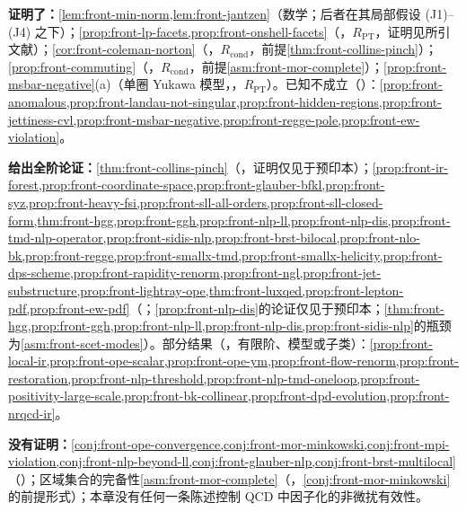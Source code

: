 \begin{tcolorbox}[enhanced,breakable,title=本章证明了什么／没有证明什么,fonttitle=\bfseries,
  colback=gray!3!white,colframe=gray!55!black,boxrule=0.6pt,arc=2pt,
  left=5pt,right=5pt,top=3pt,bottom=3pt,before skip=6pt,after skip=6pt]
\textbf{证明了：}\cref{lem:front-min-norm,lem:front-jantzen}（数学；后者在其局部假设 (J1)--(J4) 之下）；\cref{prop:front-lp-facets,prop:front-onshell-facets}（\tagR，$R_{\mathrm{PT}}$，证明见所引文献）；\cref{cor:front-coleman-norton}（\tagR，$R_{\mathrm{cond}}$，前提\cref{thm:front-collins-pinch}）；\cref{prop:front-commuting}（\tagR，$R_{\mathrm{cond}}$，前提\cref{asm:front-mor-complete}）；\cref{prop:front-msbar-negative}(a)（单圈 Yukawa 模型，\tagR，$R_{\mathrm{PT}}$）。已知不成立（\tagV）：\cref{prop:front-anomalous,prop:front-landau-not-singular,prop:front-hidden-regions,prop:front-jettiness-cvl,prop:front-msbar-negative,prop:front-regge-pole,prop:front-ew-violation}。\par
\textbf{给出全阶论证：}\cref{thm:front-collins-pinch}（\tagA，证明仅见于预印本）；\cref{prop:front-ir-forest,prop:front-coordinate-space,prop:front-glauber-bfkl,prop:front-syz,prop:front-heavy-fsi,prop:front-sll-all-orders,prop:front-sll-closed-form,thm:front-hgg,prop:front-ggh,prop:front-nlp-ll,prop:front-nlp-dis,prop:front-tmd-nlp-operator,prop:front-sidis-nlp,prop:front-brst-bilocal,prop:front-nlo-bk,prop:front-regge,prop:front-smallx-tmd,prop:front-smallx-helicity,prop:front-dps-scheme,prop:front-rapidity-renorm,prop:front-ngl,prop:front-jet-substructure,prop:front-lightray-ope,thm:front-luxqed,prop:front-lepton-pdf,prop:front-ew-pdf}（\tagA；\cref{prop:front-nlp-dis}的论证仅见于预印本；\cref{thm:front-hgg,prop:front-ggh,prop:front-nlp-ll,prop:front-nlp-dis,prop:front-sidis-nlp}的瓶颈为\cref{asm:front-scet-modes}）。部分结果（\tagP，有限阶、模型或子类）：\cref{prop:front-local-ir,prop:front-ope-scalar,prop:front-ope-ym,prop:front-flow-renorm,prop:front-restoration,prop:front-nlp-threshold,prop:front-nlp-tmd-oneloop,prop:front-positivity-large-scale,prop:front-bk-collinear,prop:front-dpd-evolution,prop:front-nrqcd-ir}。\par
\textbf{没有证明：}\cref{conj:front-ope-convergence,conj:front-mor-minkowski,conj:front-mpi-violation,conj:front-nlp-beyond-ll,conj:front-glauber-nlp,conj:front-brst-multilocal}（\tagC）；区域集合的完备性\cref{asm:front-mor-complete}（\tagC，\cref{conj:front-mor-minkowski}的前提形式）；本章没有任何一条陈述控制 QCD 中因子化的非微扰有效性。
\end{tcolorbox}

